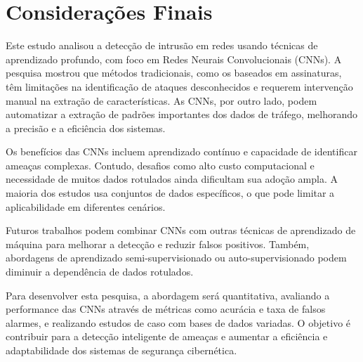 \documentclass[conference]{IEEEtran}
\begin{document}
\section{Considerações Finais}


    Este estudo analisou a detecção de intrusão em redes usando técnicas de aprendizado profundo, com foco em Redes Neurais Convolucionais (CNNs). A pesquisa mostrou que métodos tradicionais, como os baseados em assinaturas, têm limitações na identificação de ataques desconhecidos e requerem intervenção manual na extração de características. As CNNs, por outro lado, podem automatizar a extração de padrões importantes dos dados de tráfego, melhorando a precisão e a eficiência dos sistemas.
    
    Os benefícios das CNNs incluem aprendizado contínuo e capacidade de identificar ameaças complexas. Contudo, desafios como alto custo computacional e necessidade de muitos dados rotulados ainda dificultam sua adoção ampla. A maioria dos estudos usa conjuntos de dados específicos, o que pode limitar a aplicabilidade em diferentes cenários.
    
    Futuros trabalhos podem combinar CNNs com outras técnicas de aprendizado de máquina para melhorar a detecção e reduzir falsos positivos. Também, abordagens de aprendizado semi-supervisionado ou auto-supervisionado podem diminuir a dependência de dados rotulados.
    
    Para desenvolver esta pesquisa, a abordagem será quantitativa, avaliando a performance das CNNs através de métricas como acurácia e taxa de falsos alarmes, e realizando estudos de caso com bases de dados variadas. O objetivo é contribuir para a detecção inteligente de ameaças e aumentar a eficiência e adaptabilidade dos sistemas de segurança cibernética.
    
\end{document}
